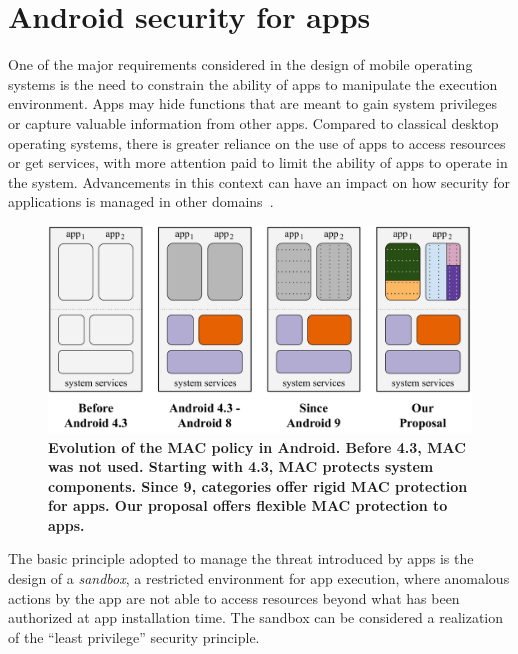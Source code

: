 \section{Android security for apps}\label{sect:seapp_andro_sec}

One of the major requirements considered in the design of mobile
operating systems is the need to constrain the ability of apps to
manipulate the execution environment.  Apps may hide functions that
are meant to gain system privileges or capture valuable information
from other apps.  Compared to classical desktop operating systems,
there is greater reliance on the use of apps to access resources or
get services, with more attention paid to limit the ability of apps to
operate in the system.  Advancements in this context can have an
impact on how security for applications is managed in other
domains~\cite{seapp_sok_android}.

\begin{figure}[t]
	\begin{center}
		\includegraphics[width=\columnwidth]{chapters/seapp/figs/mac-evolution}
	\end{center}
	\caption{\label{fig:seapp_mac_evolution}\bf Evolution of the MAC policy
          in Android.  Before 4.3, MAC was not used. Starting with 4.3,
          MAC protects system components. Since 9, categories offer
          rigid MAC protection for apps. Our proposal offers flexible
          MAC protection to apps.}
\end{figure}

The basic principle adopted to manage the threat introduced by apps is
the design of a {\em sandbox}, a restricted environment for app
execution, where anomalous actions by the app are not able to access
resources beyond what has been authorized at app installation time.
The sandbox can be considered a realization of the ``least privilege''
security principle.

